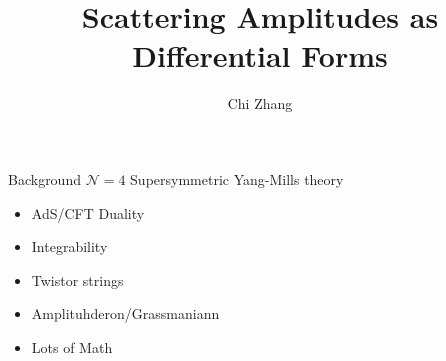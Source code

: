 \documentclass[10pt]{beamer}
\title{Scattering Amplitudes as Differential Forms}
\subtitle{}
\date{}
\author{Chi Zhang}
\institute{Institute of Theoretical Physics}
\newcommand{\themename}{\textbf{\textsc{metropolis}}\xspace}
\begin{document}
\maketitle

\iffalse
\begin{frame}{Table of contents}
  \setbeamertemplate{section in toc}[sections numbered]
  \tableofcontents[hideallsubsections]
\end{frame}

\section{Introduction}

\begin{frame}[fragile]{Metropolis}

  The \themename theme is a Beamer theme with minimal visual noise
  inspired by the \href{https://github.com/hsrmbeamertheme/hsrmbeamertheme}{\textsc{hsrm} Beamer
  Theme} by Benjamin Weiss.

  Enable the theme by loading

  \begin{verbatim}    \documentclass{beamer}
    \usetheme{metropolis}\end{verbatim}

  Note, that you have to have Mozilla's \emph{Fira Sans} font and XeTeX
  installed to enjoy this wonderful typography.
\end{frame}
\begin{frame}[fragile]{Sections}
  Sections group slides of the same topic

  \begin{verbatim}    \section{Elements}\end{verbatim}

  for which \themename provides a nice progress indicator \ldots
\end{frame}

\section{Background}
\fi
\begin{frame}{Background}
$\mathcal{N}=4$ Supersymmetric Yang-Mills theory
\begin{itemize}
  \item AdS/CFT Duality
  \item Integrability
  \item Twistor strings
  \item Amplituhderon/Grassmaniann
  \item Lots of Math
\end{itemize}
\end{frame}
\end{document}
